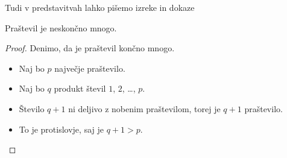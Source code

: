 \begin{frame}{Tudi v predstavitvah lahko pišemo izreke in dokaze}

	\begin{izrek}
	   Praštevil je neskončno mnogo.
	\end{izrek}
	\begin{proof}
	   Denimo, da je praštevil končno mnogo.
	   \begin{itemize}
		  \item<1-> Naj bo $p$ {\only<4>\alert{največje}} praštevilo.
		  \item<2-> Naj bo $q$ produkt števil $1$, $2$, \ldots, $p$.
		  \item<3-> Število $q+1$ ni deljivo z nobenim praštevilom, torej je $q+1$ praštevilo.
		  \item<4-> To je protislovje, saj je $q+1>p$. \qedhere
	   \end{itemize}
	\end{proof}
 \end{frame}
 
